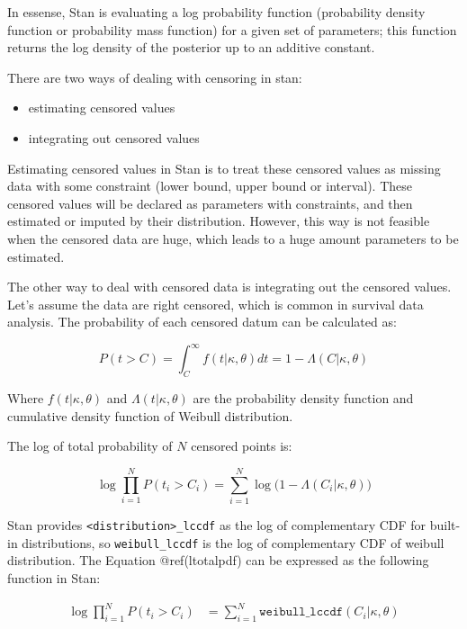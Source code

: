 \documentclass[]{article}
\providecommand{\tightlist}{%
  \setlength{\itemsep}{0pt}\setlength{\parskip}{0pt}}
\begin{document}
In essense, Stan is evaluating a log probability function (probability
density function or probability mass function) for a given set of
parameters; this function returns the log density of the posterior up to
an additive constant.

There are two ways of dealing with censoring in stan:

\begin{itemize}
\tightlist
\item
  estimating censored values
\item
  integrating out censored values
\end{itemize}

Estimating censored values in Stan is to treat these censored values as
missing data with some constraint (lower bound, upper bound or
interval). These censored values will be declared as parameters with
constraints, and then estimated or imputed by their distribution.
However, this way is not feasible when the censored data are huge, which
leads to a huge amount parameters to be estimated.

The other way to deal with censored data is integrating out the censored
values. Let's assume the data are right censored, which is common in
survival data analysis. The probability of each censored datum can be
calculated as:

\[
P(t > C) = \int_C^\infty f(t|\kappa, \theta)dt = 1 - \Lambda(C|\kappa, \theta)
\]

Where \(f(t|\kappa, \theta)\) and \(\Lambda(t|\kappa, \theta)\) are the
probability density function and cumulative density function of Weibull
distribution.

The log of total probability of \(N\) censored points is:

\begin{equation}\label{ltotalpdf}
\log \prod_{i = 1}^N P(t_i > C_i) = \sum_{i = 1}^N\log\Big(1 - \Lambda(C_i|\kappa, \theta)\Big)
\end{equation}

Stan provides \texttt{\textless{}distribution\textgreater{}\_lccdf} as
the log of complementary CDF for built-in distributions, so
\texttt{weibull\_lccdf} is the log of complementary CDF of weibull
distribution. The Equation @ref(ltotalpdf) can be expressed as the
following function in Stan:

\begin{align*}
\log \prod_{i = 1}^N P(t_i > C_i) & = \sum_{i = 1}^N \texttt{weibull_lccdf}(C_i|\kappa, \theta)
\end{align*}
\end{document}
